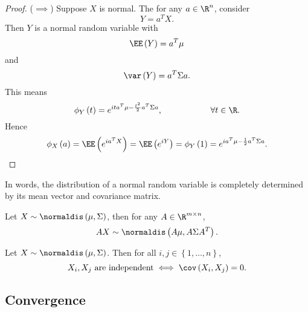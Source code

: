 \documentclass[stat901]{subfiles}
\begin{document}
\begin{proof}
        ($\implies$) Suppose $X$ is normal. The for any $a\in\R^n$, consider
        \begin{equation*}
            Y = a^{T}X.
        \end{equation*}
        Then $Y$ is a normal random variable with
        \begin{equation*}
            \EE\left( Y \right) = a^{T}\mu
        \end{equation*}
        and
        \begin{equation*}
            \var\left( Y \right) = a^{T}\Sigma a.
        \end{equation*}
        This means
        \begin{equation*}
            \phi_Y\left( t \right) = e^{ita^{T}\mu-\frac{t^{2}}{2}a^{T}\Sigma a},\hspace{2cm}\forall t\in\R.
        \end{equation*}
        Hence
        \begin{equation*}
            \phi_X\left( a \right) = \EE\left( e^{ia^{T}X} \right) = \EE\left( e^{iY} \right) = \phi_Y\left( 1 \right) = e^{ia^{T}\mu-\frac{1}{2}a^{T}\Sigma a}.
        \end{equation*}
    \end{proof}

    \np In words, the distribution of a normal random variable is completely determined by its mean vector and covariance matrix.

    \begin{cor}{}
        Let $X\sim\normaldis\left( \mu,\Sigma \right)$, then for any $A\in\R^{m\times n}$,
        \begin{equation*}
            AX \sim \normaldis\left( A\mu, A\Sigma A^{T} \right).
        \end{equation*}
    \end{cor}	

    \rruleline

    \begin{cor}{}
        Let $X\sim\normaldis\left( \mu,\Sigma \right)$. Then for all $i,j\in\left\lbrace 1,\ldots,n \right\rbrace$,
        \begin{equation*}
            \text{$X_i,X_j$ are independent} \iff \cov\left( X_i,X_j \right) = 0.
        \end{equation*}
    \end{cor}	

    \rruleline

    \subsection{Convergence}
    
\end{document}
